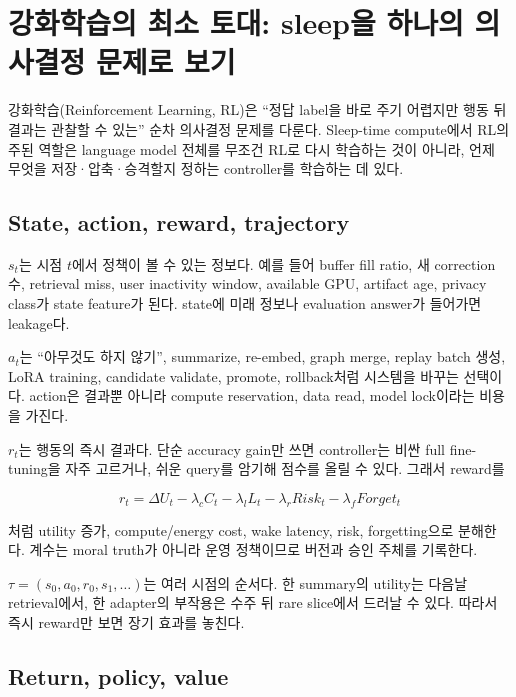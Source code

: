 \chapter{강화학습의 최소 토대: sleep을 하나의 의사결정 문제로 보기}
\label{bg:chapter-rl-foundations}

강화학습(Reinforcement Learning, RL)은 ``정답 label을 바로 주기 어렵지만 행동 뒤 결과는 관찰할 수
있는'' 순차 의사결정 문제를 다룬다. Sleep-time compute에서 RL의 주된 역할은 language model 전체를
무조건 RL로 다시 학습하는 것이 아니라, 언제 무엇을 저장·압축·승격할지 정하는 controller를 학습하는
데 있다.

\section{State, action, reward, trajectory}

 $s_t$는 시점 $t$에서 정책이 볼 수 있는 정보다. 예를 들어 buffer fill ratio,
새 correction 수, retrieval miss, user inactivity window, available GPU, artifact age, privacy class가
state feature가 된다. state에 미래 정보나 evaluation answer가 들어가면 leakage다.

 $a_t$는 ``아무것도 하지 않기'', summarize, re-embed, graph merge, replay batch
생성, LoRA training, candidate validate, promote, rollback처럼 시스템을 바꾸는 선택이다. action은
결과뿐 아니라 compute reservation, data read, model lock이라는 비용을 가진다.

 $r_t$는 행동의 즉시 결과다. 단순 accuracy gain만 쓰면 controller는 비싼 full
fine-tuning을 자주 고르거나, 쉬운 query를 암기해 점수를 올릴 수 있다. 그래서 reward를

\begin{equation}
r_t=\Delta U_t-\lambda_c C_t-\lambda_l L_t-\lambda_r Risk_t
-\lambda_f Forget_t
\end{equation}

처럼 utility 증가, compute/energy cost, wake latency, risk, forgetting으로 분해한다. 계수는 moral truth가
아니라 운영 정책이므로 버전과 승인 주체를 기록한다.

 $\tau=(s_0,a_0,r_0,s_1,\ldots)$는 여러 시점의 순서다. 한 summary의 utility는
다음날 retrieval에서, 한 adapter의 부작용은 수주 뒤 rare slice에서 드러날 수 있다. 따라서 즉시 reward만
보면 장기 효과를 놓친다.

\section{Return, policy, value}

